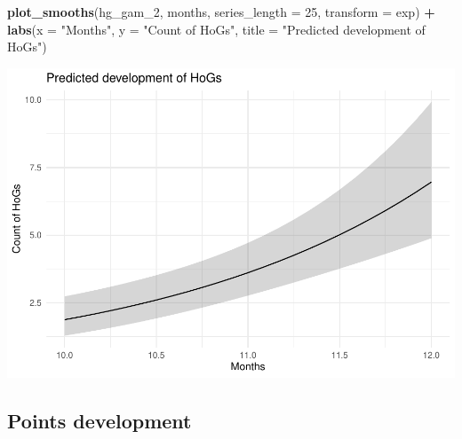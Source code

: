 \documentclass[]{article}
\newenvironment{Shaded}{\begin{snugshade}}{\end{snugshade}}
\newcommand{\DataTypeTok}[1]{\textcolor[rgb]{0.13,0.29,0.53}{#1}}
\newcommand{\DecValTok}[1]{\textcolor[rgb]{0.00,0.00,0.81}{#1}}
\newcommand{\FloatTok}[1]{\textcolor[rgb]{0.00,0.00,0.81}{#1}}
\newcommand{\KeywordTok}[1]{\textcolor[rgb]{0.13,0.29,0.53}{\textbf{#1}}}
\newcommand{\NormalTok}[1]{#1}
\newcommand{\OperatorTok}[1]{\textcolor[rgb]{0.81,0.36,0.00}{\textbf{#1}}}
\newcommand{\StringTok}[1]{\textcolor[rgb]{0.31,0.60,0.02}{#1}}
\begin{document}
\begin{Shaded}
\begin{Highlighting}[]
\KeywordTok{plot_smooths}\NormalTok{(hg_gam_}\DecValTok{2}\NormalTok{, months, }\DataTypeTok{series_length =} \DecValTok{25}\NormalTok{, }\DataTypeTok{transform =}\NormalTok{ exp) }\OperatorTok{+}
\StringTok{  }\KeywordTok{labs}\NormalTok{(}\DataTypeTok{x =} \StringTok{"Months"}\NormalTok{, }\DataTypeTok{y =} \StringTok{"Count of HoGs"}\NormalTok{, }\DataTypeTok{title =} \StringTok{"Predicted development of HoGs"}\NormalTok{)}
\end{Highlighting}
\end{Shaded}

\includegraphics{supplement_files/figure-latex/hg-gam-2-plot-1.pdf}

\hypertarget{points-development}{%
\subsection{Points development}\label{points-development}}

\begin{Shaded}
\end{Shaded}
\end{document}
